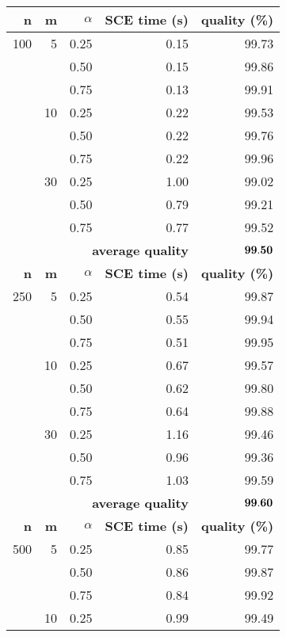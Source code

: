 \begin{table}
{
\renewcommand{\arraystretch}{1.5}%
\fontsize{8.5pt}{1em}\selectfont 
\begin{center}
\begin{tabular}{|r|r|r|rr|} \hline
\textbf{n}   & \textbf{m}  & \textbf{$\alpha$} & \textbf{SCE time (s)} & \textbf{quality (\%)} \\ \hline
100 &  5 & 0.25 & 0.15 & 99.73 \\
    &    & 0.50 & 0.15 & 99.86 \\
    &    & 0.75 & 0.13 & 99.91 \\ \cline{2-5}
    & 10 & 0.25 & 0.22 & 99.53 \\
    &    & 0.50 & 0.22 & 99.76 \\
    &    & 0.75 & 0.22 & 99.96 \\ \cline{2-5}
    & 30 & 0.25 & 1.00 & 99.02 \\
    &    & 0.50 & 0.79 & 99.21 \\
    &    & 0.75 & 0.77 & 99.52 \\ \cline{2-5}
    & \multicolumn{3}{r}{\textbf{average quality}}  & $\bf 99.50$  \\ \hline \hline
\textbf{n}   & \textbf{m}  & \textbf{$\alpha$} & \textbf{SCE time (s)} & \textbf{quality (\%)} \\ \hline
250 &  5 & 0.25 & 0.54 & 99.87 \\
    &    & 0.50 & 0.55 & 99.94 \\
    &    & 0.75 & 0.51 & 99.95 \\ \cline{2-5}
    & 10 & 0.25 & 0.67 & 99.57 \\
    &    & 0.50 & 0.62 & 99.80 \\
    &    & 0.75 & 0.64 & 99.88 \\ \cline{2-5}
    & 30 & 0.25 & 1.16 & 99.46 \\
    &    & 0.50 & 0.96 & 99.36 \\
    &    & 0.75 & 1.03 & 99.59 \\ \cline{2-5}
    & \multicolumn{3}{r}{\textbf{average quality}}  & $\bf 99.60$  \\ \hline \hline
\textbf{n}   & \textbf{m}  & \textbf{$\alpha$} & \textbf{SCE time (s)} & \textbf{quality (\%)} \\ \hline
500 &  5 & 0.25 & 0.85 & 99.77 \\
    &    & 0.50 & 0.86 & 99.87 \\
    &    & 0.75 & 0.84 & 99.92 \\ \cline{2-5}
    & 10 & 0.25 & 0.99 & 99.49 \\

\end{tabular}
\end{center}}
\end{table}
